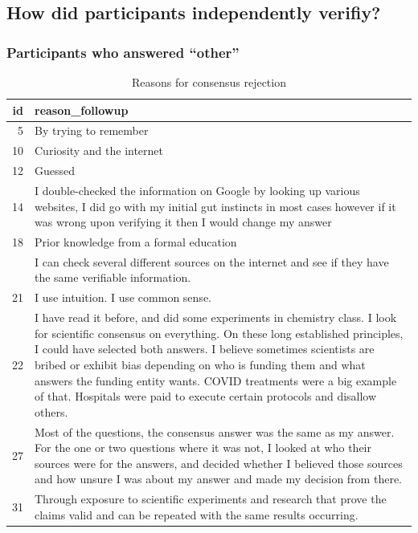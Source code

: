 \documentclass[
  doc,floatsintext]{apa6}
\begin{document}
\subsection{How did participants independently verifiy?}\label{how-did-participants-independently-verifiy}

\subsubsection{Participants who answered ``other''}\label{participants-who-answered-other-1}

\begin{longtable}[t]{>{}r>{\raggedright\arraybackslash}p{30em}}
\caption{\label{tab:exp3-independent-verification}Reasons for consensus rejection}\\
\toprule
id & reason\_followup\\
\midrule
5 & By trying to remember\\
10 & Curiosity and the internet\\
12 & Guessed\\
14 & I double-checked the information on Google by looking up various websites, I did go with my initial gut instincts in most cases however if it was wrong upon verifying it then I would change my answer\\
18 & Prior knowledge from a formal education\\
\addlinespace
19 & I can check several different sources on the internet and see if they have the same verifiable information.\\
21 & I use intuition.  I use common sense.\\
22 & I have read it before, and did some experiments in chemistry class.  I look for scientific consensus on everything.  On these long established principles, I could have selected both answers.  I believe sometimes scientists are bribed or exhibit bias depending on who is funding them and what answers the funding entity wants. COVID treatments were a big example of that.  Hospitals were paid to execute certain protocols and disallow others.\\
27 & Most of the questions, the consensus answer was the same as my answer. For the one or two questions where it was not, I looked at who their sources were for the answers, and decided whether I believed those sources and how unsure I was about my answer and made my decision from there.\\
31 & Through exposure to scientific experiments and research that prove the claims valid and can be repeated with the same results occurring.\\

\end{longtable}
\end{document}
